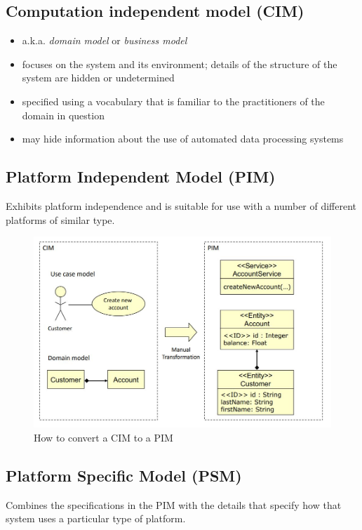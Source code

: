 		\subsection{Computation independent model (CIM)}
			\begin{itemize}
				\item a.k.a. \textit{domain model} or \textit{business model}
				\item focuses on the system and its environment; details of the structure of the system are hidden or undetermined
				\item specified using a vocabulary that is familiar to the practitioners of the domain in question
				\item may hide information about the use of	automated data processing systems
			\end{itemize}
		
		\subsection{Platform Independent Model (PIM)}
			Exhibits platform independence and is suitable for use with a number of different platforms of similar type.
			
		\begin{figure}[h!]
			\includegraphics[scale=0.5]{res/cim-to-pim.jpg}
			\caption{How to convert a CIM to a PIM}
		\end{figure}
			
		\subsection{Platform Specific Model (PSM)}
			 Combines the specifications in the PIM with the details that specify how that system uses a particular type of platform.
			 
